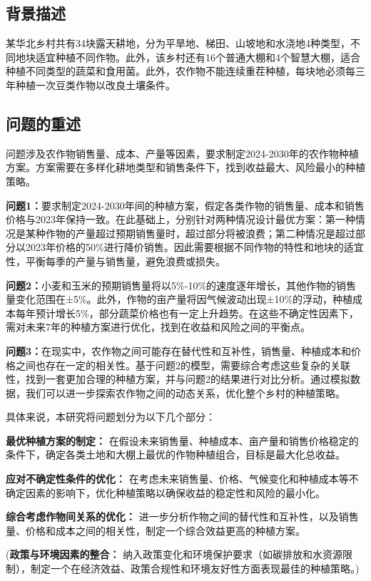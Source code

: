 \documentclass{cumcmthesis}
\begin{document}
\subsection{背景描述}
某华北乡村共有34块露天耕地，分为平旱地、梯田、山坡地和水浇地4种类型，不同地块适宜种植不同作物。此外，该乡村还有16个普通大棚和4个智慧大棚，适合种植不同类型的蔬菜和食用菌。此外，农作物不能连续重茬种植，每块地必须每三年种植一次豆类作物以改良土壤条件。
\subsection{问题的重述}
问题涉及农作物销售量、成本、产量等因素，要求制定2024-2030年的农作物种植方案。方案需要在多样化耕地类型和销售条件下，找到收益最大、风险最小的种植策略。

\textbf{问题1：}要求制定2024-2030年间的种植方案，假定各类作物的销售量、成本和销售价格与2023年保持一致。在此基础上，分别针对两种情况设计最优方案：第一种情况是某种作物的产量超过预期销售量时，超过部分将被浪费；第二种情况是超过部分以2023年价格的50\%进行降价销售。因此需要根据不同作物的特性和地块的适宜性，平衡每季的产量与销售量，避免浪费或损失。

\textbf{问题2：}小麦和玉米的预期销售量将以5\%-10\%的速度逐年增长，其他作物的销售量变化范围在±5\%。此外，作物的亩产量将因气候波动出现±10\%的浮动，种植成本每年预计增长5\%，部分蔬菜价格也有一定上升趋势。在这些不确定性因素下，需对未来7年的种植方案进行优化，找到在收益和风险之间的平衡点。

\textbf{问题3：}在现实中，农作物之间可能存在替代性和互补性，销售量、种植成本和价格之间也存在一定的相关性。基于问题2的模型，需要综合考虑这些复杂的关联性，找到一套更加合理的种植方案，并与问题2的结果进行对比分析。通过模拟数据，我们可以进一步探索农作物之间的动态关系，优化整个乡村的种植策略。

具体来说，本研究将问题划分为以下几个部分：

\textbf{最优种植方案的制定：} 在假设未来销售量、种植成本、亩产量和销售价格稳定的条件下，确定各类土地和大棚上最优的作物种植组合，目标是最大化总收益。

\textbf{应对不确定性条件的优化：} 在考虑未来销售量、价格、气候变化和种植成本等不确定因素的影响下，优化种植策略以确保收益的稳定性和风险的最小化。

\textbf{综合考虑作物间关系的优化：} 进一步分析作物之间的替代性和互补性，以及销售量、价格和成本之间的相关性，制定一个综合效益更高的种植方案。

(\textbf{政策与环境因素的整合：} 纳入政策变化和环境保护要求（如碳排放和水资源限制），制定一个在经济效益、政策合规性和环境友好性方面表现最佳的种植策略。)
\end{document}
